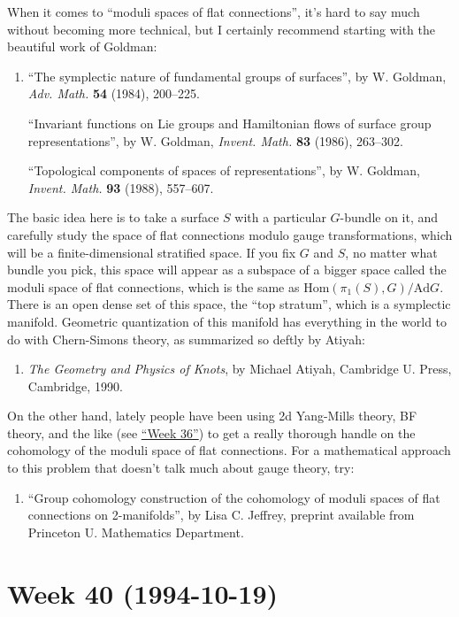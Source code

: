 \documentclass{article}
\def\tightlist{}
\begin{document}
When it comes to ``moduli spaces of flat connections'', it's hard to say
much without becoming more technical, but I certainly recommend starting
with the beautiful work of Goldman:

\begin{enumerate}
\def\labelenumi{\arabic{enumi})}
\setcounter{enumi}{3}
\item
  ``The symplectic nature of fundamental groups of surfaces'', by W.
  Goldman, \emph{Adv. Math.} \textbf{54} (1984), 200--225.

  ``Invariant functions on Lie groups and Hamiltonian flows of surface
  group representations'', by W. Goldman, \emph{Invent. Math.}
  \textbf{83} (1986), 263--302.

  ``Topological components of spaces of representations'', by W.
  Goldman, \emph{Invent. Math.} \textbf{93} (1988), 557--607.
\end{enumerate}

The basic idea here is to take a surface \(S\) with a particular
\(G\)-bundle on it, and carefully study the space of flat connections
modulo gauge transformations, which will be a finite-dimensional
stratified space. If you fix \(G\) and \(S\), no matter what bundle you
pick, this space will appear as a subspace of a bigger space called the
moduli space of flat connections, which is the same as
\(\mathrm{Hom}(\pi_1(S),G)/\mathrm{Ad} G\). There is an open dense set
of this space, the ``top stratum'', which is a symplectic manifold.
Geometric quantization of this manifold has everything in the world to
do with Chern-Simons theory, as summarized so deftly by Atiyah:

\begin{enumerate}
\def\labelenumi{\arabic{enumi})}
\setcounter{enumi}{4}
\tightlist
\item
  \emph{The Geometry and Physics of Knots}, by Michael Atiyah, Cambridge
  U. Press, Cambridge, 1990.
\end{enumerate}

On the other hand, lately people have been using 2d Yang-Mills theory,
BF theory, and the like (see \protect\hyperlink{week36}{``Week 36''}) to
get a really thorough handle on the cohomology of the moduli space of
flat connections. For a mathematical approach to this problem that
doesn't talk much about gauge theory, try:

\begin{enumerate}
\def\labelenumi{\arabic{enumi})}
\setcounter{enumi}{5}
\tightlist
\item
  ``Group cohomology construction of the cohomology of moduli spaces of
  flat connections on 2-manifolds'', by Lisa C. Jeffrey, preprint
  available from Princeton U. Mathematics Department.
\end{enumerate}
\hypertarget{week40}{%
\section{Week 40 (1994-10-19)}\label{week40}}
\end{document}
